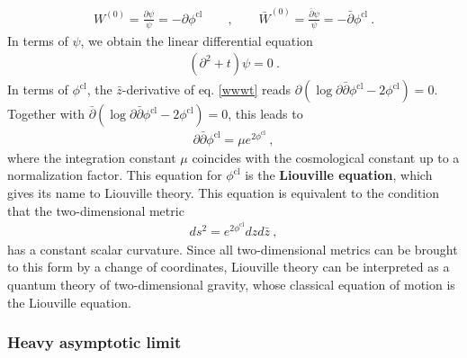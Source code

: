 \documentclass[12pt, a4paper, notitlepage, twoside]{report}
\numberwithin{equation}{section}
\theoremstyle{break}
\begin{document}
\begin{align}
 W^{(0)} = \frac{\partial\psi}{\psi} = -\partial \phi^\text{cl} \qquad , \qquad \bar W^{(0)} = \frac{\bar\partial\psi}{\psi}= -\bar\partial \phi^\text{cl}\ .
\end{align}
In terms of $\psi$, we obtain the linear differential equation
\begin{align}
 \boxed{ (\partial^2 + t ) \psi = 0 } \ .
 \label{dtp}
\end{align}
In terms of $\phi^\text{cl}$, the $\bar{z}$-derivative of eq. \eqref{wwwt} reads $\partial\left(\log \partial\bar{\partial}\phi^\text{cl} -2\phi^\text{cl}\right)=0$. Together with $\bar{\partial} \left(\log \partial\bar{\partial}\phi^\text{cl} -2\phi^\text{cl}\right)=0$, this leads to 
\begin{align}
 \partial\bar{\partial}\phi^\text{cl} = \mu e^{2\phi^\text{cl}}\ ,
\end{align}
where the integration constant $\mu$ coincides with the cosmological constant up to a normalization factor.
This equation for $\phi^\text{cl}$ is the \textbf{\boldmath Liouville equation}, which gives its name to Liouville theory.
This equation is equivalent to the condition that the two-dimensional metric
\begin{align}
 ds^2 = e^{2\phi^\text{cl}} dz d\bar{z}\ ,
\end{align}
has a constant scalar curvature.
Since all two-dimensional metrics can be brought to this form by a change of coordinates, Liouville theory can be interpreted as a quantum theory of two-dimensional gravity, whose classical equation of motion is the Liouville equation.

\subsubsection{Heavy asymptotic limit}
\end{document}
